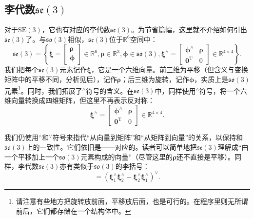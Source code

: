 \subsection{李代数$\mathfrak{se}(3)$}
对于$\mathrm{SE}(3)$，它也有对应的李代数$\mathfrak{se}(3)$。为节省篇幅，这里就不介绍如何引出$\mathfrak{se}(3)$了。与$\mathfrak{so}(3)$相似，$\mathfrak{se}(3)$位于$\mathbb{R}^6$空间中：
\begin{equation}
\mathfrak{se}(3) = \left\{ { \bm{\xi}  = \left[ \begin{array}{l}
	\bm{\rho} \\
	\bm{\phi} 
	\end{array} \right]
	 \in { \mathbb{R}^6} ,
	 \bm{\rho}  \in { \mathbb{R}^3}, \bm{\phi}  \in \mathfrak{so} \left( 3 \right),{ \bm{\xi} ^ \wedge } = \left[ {\begin{array}{*{20}{c}}
		{{ \bm{\phi} ^ \wedge }}& \bm{\rho} \\
		{{\bm{0}^\mathrm{T}}}&0
		\end{array}} \right] \in { \mathbb{R}^{4 \times 4}}} \right\}.
\end{equation}
我们把每个$\mathfrak{se}(3)$元素记作$\bm{\xi}$，它是一个六维向量。前三维为平移（但含义与变换矩阵中的平移不同，分析见后），记作$\bm{\rho}$；后三维为旋转，记作$\bm{\phi}$，实质上是$\mathfrak{so}(3)$元素\footnote{请注意有些地方把旋转放前面，平移放后面，也是可行的。在程序里则无所谓前后，它们都存储在一个结构体中。}。同时，我们拓展了$^\wedge$符号的含义。在$\mathfrak{se}(3)$中，同样使用$^\wedge$符号，将一个六维向量转换成四维矩阵，但这里不再表示反对称：
\begin{equation}
{ \bm{\xi} ^ \wedge } = \left[ {\begin{array}{*{20}{c}}
	{{ \bm{\phi} ^ \wedge }}& \bm{\rho} \\
	{{\bm{0}^\mathrm{T}}}&0
	\end{array}} \right] \in { \mathbb{R}^{4 \times 4}}.
\end{equation}

我们仍使用$^\wedge$和$^\vee$符号来指代“从向量到矩阵”和“从矩阵到向量”的关系，以保持和$\mathfrak{so}(3)$上的一致性。它们依旧是一一对应的。读者可以简单地把$\mathfrak{se}(3)$理解成“由一个平移加上一个$\mathfrak{so}(3)$元素构成的向量”（尽管这里的$\bm{\rho}$还不直接是平移）。同样，李代数$\mathfrak{se}(3)$亦有类似于$\mathfrak{so}(3)$的李括号：
\begin{equation}
[ \bm{\xi}_1, \bm{\xi}_2 ] = \left( \bm{\xi}_1^\wedge \bm{\xi}_2^\wedge -\bm{\xi}_2^\wedge \bm{\xi}_1^\wedge \right) ^\vee.
\end{equation}

